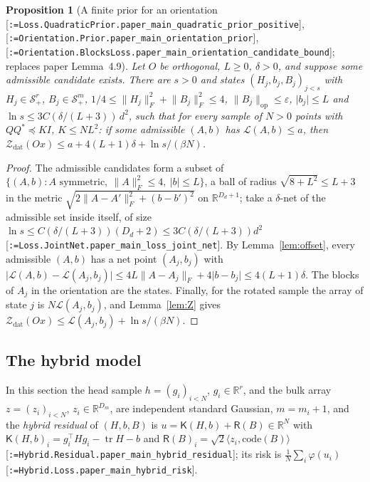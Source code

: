 \documentclass[11pt]{article}
\makeatletter
\newcommand{\formal@break}[1]{\@tfor\formal@tok:=#1\do{%
  \formal@tok
  \expandafter\ifx\formal@tok.\allowbreak\else
  \expandafter\ifx\formal@tok\_\allowbreak\fi\fi}}
\DeclareRobustCommand{\formal}[1]{\textnormal{[\texttt{\small\formal@break{#1}}]}}
\newcommand{\R}{\mathbb{R}}
\newcommand{\Spsd}{\mathcal{S}_{+}}
\newcommand{\ip}[2]{\langle #1, #2\rangle}
\newcommand{\norm}[1]{\lVert #1\rVert}
\newcommand{\abs}[1]{\lvert #1\rvert}
\newcommand{\tr}{\operatorname{tr}}
\newcommand{\op}{\mathrm{op}}
\newcommand{\Fro}{F}
\newcommand{\Id}{I}
\newcommand{\Dd}{D}
\theoremstyle{plain}
\newtheorem{proposition}[theorem]{Proposition}
\theoremstyle{definition}
\makeatother
\begin{document}
\begin{proposition}[A finite prior for an orientation \formal{Loss.QuadraticPrior.paper\_main\_quadratic\_prior\_positive}, \formal{Orientation.Prior.paper\_main\_orientation\_prior}, \formal{Orientation.BlocksLoss.paper\_main\_orientation\_candidate\_bound}; replaces paper Lemma~4.9]\label{prop:prior}
Let $O$ be orthogonal, $L \ge 0$, $\delta > 0$, and suppose some admissible
candidate exists. There are $s > 0$ and states $(H_j, b_j, B_j)_{j<s}$ with
$H_j \in \Spsd^r$, $B_j \in \Spsd^m$, $1/4 \le \norm{H_j}_\Fro^2 + \norm{B_j}_\Fro^2 \le 4$,
$\norm{B_j}_\op \le \varepsilon$, $\abs{b_j} \le L$ and
$\ln s \le 3C(\delta/(L+3))\,d^2$, such that for every sample of $N > 0$ points
with $QQ^{*} \preceq K\Id$, $K \le NL^2$: if some admissible $(A, b)$ has
$\mathcal{L}(A, b) \le a$, then $\mathcal{Z}_{\mathrm{dat}}(Ox) \le a + 4(L+1)\delta + \ln s/(\beta N)$.
\end{proposition}

\begin{proof}
The admissible candidates form a subset of $\{(A, b) : A \text{ symmetric},\ \norm{A}_\Fro^2 \le 4,\ \abs{b} \le L\}$,
a ball of radius $\sqrt{8 + L^2} \le L + 3$ in the metric
$\sqrt{2\norm{A - A'}_\Fro^2 + (b - b')^2}$ on $\R^{\Dd_d + 1}$; take a
$\delta$-net of the admissible set inside itself, of size
$\ln s \le C(\delta/(L+3))(\Dd_d + 2) \le 3C(\delta/(L+3))d^2$
\formal{Loss.JointNet.paper\_main\_loss\_joint\_net}. By Lemma~\ref{lem:offset},
every admissible $(A, b)$ has a net point $(A_j, b_j)$ with
$\abs{\mathcal{L}(A, b) - \mathcal{L}(A_j, b_j)} \le 4L\norm{A - A_j}_\Fro + 4\abs{b - b_j} \le 4(L+1)\delta$.
The blocks of $A_j$ in the orientation are the states. Finally, for the
rotated sample the array of state $j$ is $N\mathcal{L}(A_j, b_j)$, and
Lemma~\ref{lem:Z} gives $\mathcal{Z}_{\mathrm{dat}}(Ox) \le \mathcal{L}(A_j, b_j) + \ln s/(\beta N)$.
\end{proof}

\subsection{The hybrid model}\label{sec:hybrid}

In this section the head sample $h = (g_i)_{i<N}$, $g_i \in \R^r$, and the
bulk array $z = (z_i)_{i<N}$, $z_i \in \R^{\Dd_m}$, are independent standard
Gaussian, $m = m_i + 1$, and the \emph{hybrid residual} of $(H, b, B)$ is
$u = \mathsf{K}(H, b) + \mathsf{R}(B) \in \R^N$ with
$\mathsf{K}(H,b)_i = g_i^{\top}Hg_i - \tr H - b$ and
$\mathsf{R}(B)_i = \sqrt2\ip{z_i}{\mathrm{code}(B)}$
\formal{Hybrid.Residual.paper\_main\_hybrid\_residual}; its risk is
$\frac1N\sum_i\varphi(u_i)$ \formal{Hybrid.Loss.paper\_main\_hybrid\_risk}.
\end{document}
